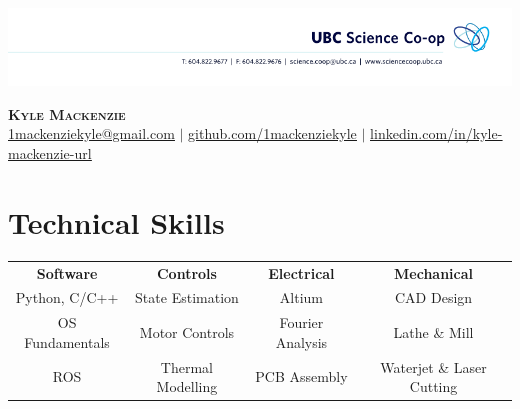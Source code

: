 \documentclass[letterpaper,11pt]{article}
\begin{document}

\begin{center}
\vspace*{-1.5cm}
    \centerline{\includegraphics[width=\paperwidth]{head}}
    \textbf{\Huge \scshape Kyle Mackenzie} \\ \vspace{1pt}
    \href{mailto:1mackenziekyle@gmail.com}{\underline{1mackenziekyle@gmail.com}} $|$
    \small \href{https://github.com/1mackenziekyle}{\underline{github.com/1mackenziekyle}} $|$
    \href{https://www.linkedin.com/in/kyle-mackenzie-url/}{\underline{linkedin.com/in/kyle-mackenzie-url}}  
    
    
\end{center}

 
  
%
\section{Technical Skills}
\begin{center}
    \begin{tabular*}{\textwidth}{@{\extracolsep{\fill}}cccc}
        \textbf{Software} & \textbf{Controls} & \textbf{Electrical} & \textbf{Mechanical} \\
        Python, C/C++ & State Estimation & Altium & CAD Design \\
        OS Fundamentals & Motor Controls & Fourier Analysis & Lathe \& Mill \\
        ROS & Thermal Modelling & PCB Assembly & Waterjet \& Laser Cutting \\
    \end{tabular*}
\end{center}

\vspace{-7mm}
\end{document}
